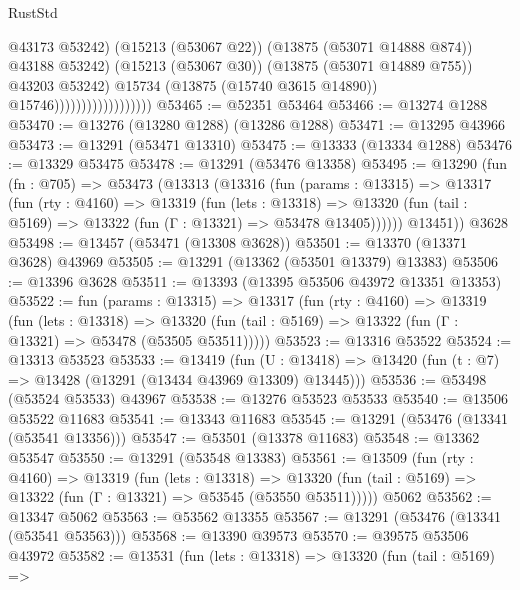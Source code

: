 \begin{lexlean}{RustStd}
\begin{coremodule}
                                              @43173
                                              @53242)
                                            (@15213 (@53067 @22))
                                            (@13875 (@53071 @14888 @874))
                                            @43188
                                            @53242)
                                          (@15213 (@53067 @30))
                                          (@13875 (@53071 @14889 @755))
                                          @43203
                                          @53242)
                                        @15734
                                        (@13875 (@15740 @3615 @14890))
                                        @15746))))))))))))))))))
@53465 := @52351 @53464
@53466 := @13274 @1288
@53470 := @13276 (@13280 @1288) (@13286 @1288)
@53471 := @13295 @43966
@53473 := @13291 (@53471 @13310)
@53475 := @13333 (@13334 @1288)
@53476 := @13329 @53475
@53478 := @13291 (@53476 @13358)
@53495 := @13290
    (fun (fn : @705) =>
    @53473
      (@13313
        (@13316
          (fun (params : @13315) =>
          @13317
            (fun (rty : @4160) =>
            @13319
              (fun (lets : @13318) =>
              @13320 (fun (tail : @5169) => @13322 (fun (Γ : @13321) => @53478 @13405))))))
        @13451))
    @3628
@53498 := @13457 (@53471 (@13308 @3628))
@53501 := @13370 (@13371 @3628) @43969
@53505 := @13291 (@13362 (@53501 @13379) @13383)
@53506 := @13396 @3628
@53511 := @13393 (@13395 @53506 @43972 @13351 @13353)
@53522 := fun (params : @13315) =>
  @13317
    (fun (rty : @4160) =>
    @13319
      (fun (lets : @13318) =>
      @13320 (fun (tail : @5169) => @13322 (fun (Γ : @13321) => @53478 (@53505 @53511)))))
@53523 := @13316 @53522
@53524 := @13313 @53523
@53533 := @13419
    (fun (U : @13418) => @13420 (fun (t : @7) => @13428 (@13291 (@13434 @43969 @13309) @13445)))
@53536 := @53498 (@53524 @53533) @43967
@53538 := @13276 @53523 @53533
@53540 := @13506 @53522 @11683
@53541 := @13343 @11683
@53545 := @13291 (@53476 (@13341 (@53541 @13356)))
@53547 := @53501 (@13378 @11683)
@53548 := @13362 @53547
@53550 := @13291 (@53548 @13383)
@53561 := @13509
    (fun (rty : @4160) =>
    @13319
      (fun (lets : @13318) =>
      @13320 (fun (tail : @5169) => @13322 (fun (Γ : @13321) => @53545 (@53550 @53511)))))
    @5062
@53562 := @13347 @5062
@53563 := @53562 @13355
@53567 := @13291 (@53476 (@13341 (@53541 @53563)))
@53568 := @13390 @39573
@53570 := @39575 @53506 @43972
@53582 := @13531
    (fun (lets : @13318) =>
    @13320
      (fun (tail : @5169) =>

\end{coremodule}
\end{lexlean}
